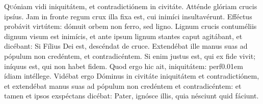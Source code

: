 
 \lettrine{Q}{u}óniam vidi iniquitátem, et contradictiónem in civitáte. Atténde glóriam crucis ipsíus. Jam in fronte regum crux illa fixa est, cui inimíci insultavérunt. Efféctus probávit virtútem: dómuit orbem non ferro, sed ligno. Lignum crucis contuméliis dignum visum est inimícis, et ante ipsum lignum stantes caput agitábant, et dicébant: Si Fílius Dei est, descéndat de cruce. Extendébat ille manus suas ad pópulum non credéntem, et contradicéntem. Si enim justus est, qui ex fide vivit; iníquus est, qui non habet fidem. Quod ergo hic ait, iniquitátem: perf\kern0.01em ídiam intéllege. Vidébat ergo Dóminus in civitáte iniquitátem et contradictiónem, et extendébat manus suas ad pópulum non credéntem et contradicéntem: et tamen et ipsos exspéctans dicébat: Pater, ignósce illis, quia nésciunt quid fáciunt.